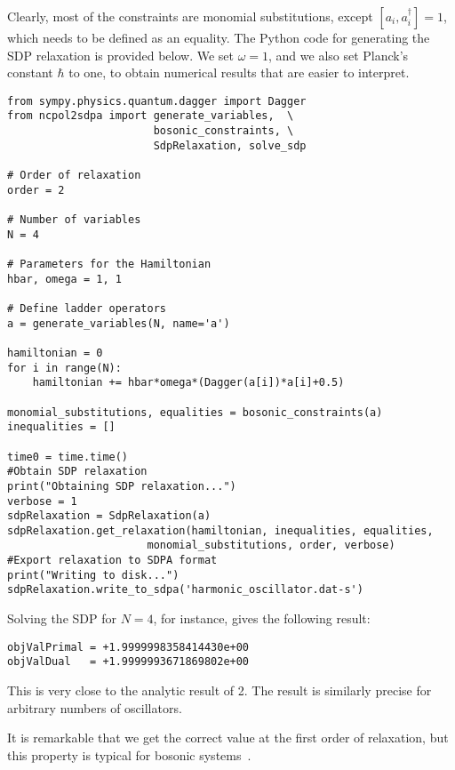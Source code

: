 \documentclass{article}
\begin{document}
Clearly, most of the constraints are monomial substitutions, except $[a_{i},a_{i}^{\dagger}]=1$, which needs to be defined as an equality. The Python code for generating the SDP relaxation is provided below. We set $\omega=1$, and we also set Planck's constant $\hbar$ to one, to obtain numerical results that are easier to interpret.
\begin{verbatim}
from sympy.physics.quantum.dagger import Dagger
from ncpol2sdpa import generate_variables,  \
                       bosonic_constraints, \
                       SdpRelaxation, solve_sdp

# Order of relaxation
order = 2

# Number of variables
N = 4

# Parameters for the Hamiltonian
hbar, omega = 1, 1

# Define ladder operators
a = generate_variables(N, name='a')

hamiltonian = 0
for i in range(N):
    hamiltonian += hbar*omega*(Dagger(a[i])*a[i]+0.5)

monomial_substitutions, equalities = bosonic_constraints(a)
inequalities = []

time0 = time.time()
#Obtain SDP relaxation
print("Obtaining SDP relaxation...")
verbose = 1
sdpRelaxation = SdpRelaxation(a)
sdpRelaxation.get_relaxation(hamiltonian, inequalities, equalities, 
                      monomial_substitutions, order, verbose)
#Export relaxation to SDPA format
print("Writing to disk...")
sdpRelaxation.write_to_sdpa('harmonic_oscillator.dat-s')                      
\end{verbatim}

Solving the SDP for $N=4$, for instance, gives the following result:
\begin{verbatim}
objValPrimal = +1.9999998358414430e+00
objValDual   = +1.9999993671869802e+00
\end{verbatim}
This is very close to the analytic result of 2. The result is similarly precise for arbitrary numbers of oscillators. 

It is remarkable that we get the correct value at the first order of relaxation, but this property is typical for bosonic systems~\citep{navascues2013paradox}.
\end{document}
